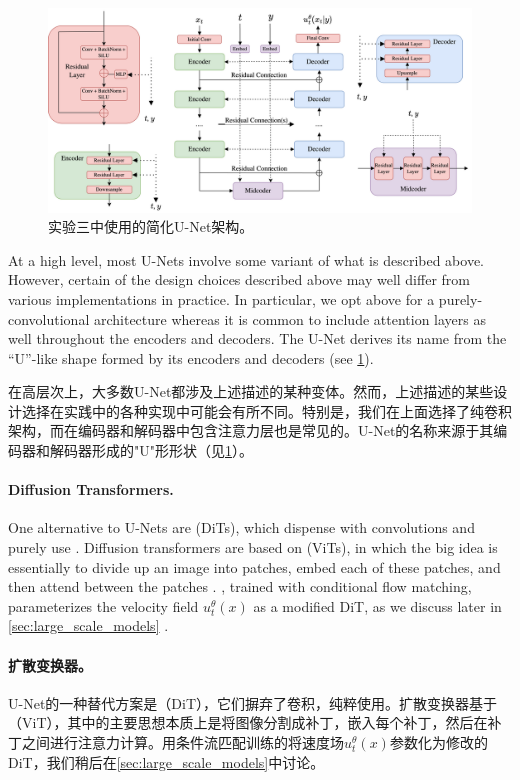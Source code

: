 \begin{figure}
    \centering
    \includegraphics[width=\textwidth]{figures/unet.png}
    \caption{实验三中使用的简化U-Net架构。}
    \label{fig:unet}
\end{figure}

At a high level, most U-Nets involve some variant of what is described above. However, certain of the design choices described above may well differ from various implementations in practice. In particular, we opt above for a purely-convolutional architecture whereas it is common to include attention layers as well throughout the encoders and decoders. The U-Net derives its name from the ``U''-like shape formed by its encoders and decoders (see \cref{fig:unet}).

在高层次上，大多数U-Net都涉及上述描述的某种变体。然而，上述描述的某些设计选择在实践中的各种实现中可能会有所不同。特别是，我们在上面选择了纯卷积架构，而在编码器和解码器中包含注意力层也是常见的。U-Net的名称来源于其编码器和解码器形成的"U"形形状（见\cref{fig:unet}）。

\paragraph{Diffusion Transformers.} One alternative to U-Nets are  (DiTs), which dispense with convolutions and purely use  \cite{attention, dit}. Diffusion transformers are based on  (ViTs), in which the big idea is essentially to divide up an image into patches, embed each of these patches, and then attend between the patches \cite{vit}. , trained with conditional flow matching, parameterizes the velocity field $u_t^{\theta}(x)$ as a modified DiT, as we discuss later in \cref{sec:large_scale_models} \cite{sd3}.

\paragraph{扩散变换器。} U-Net的一种替代方案是（DiT），它们摒弃了卷积，纯粹使用\cite{attention, dit}。扩散变换器基于（ViT），其中的主要思想本质上是将图像分割成补丁，嵌入每个补丁，然后在补丁之间进行注意力计算\cite{vit}。用条件流匹配训练的将速度场$u_t^{\theta}(x)$参数化为修改的DiT，我们稍后在\cref{sec:large_scale_models}中讨论\cite{sd3}。

